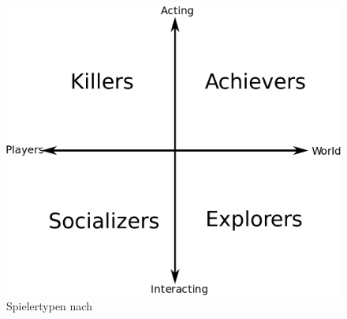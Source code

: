 \begin{figure}[H]
\begin{center}
\includegraphics[width=120mm]{images/ch4_img01_playertypes.png}
\caption{Spielertypen nach \textcite{Bartle.2004}}
\label{img:ch03_img02_flow}
\end{center}
\end{figure}

